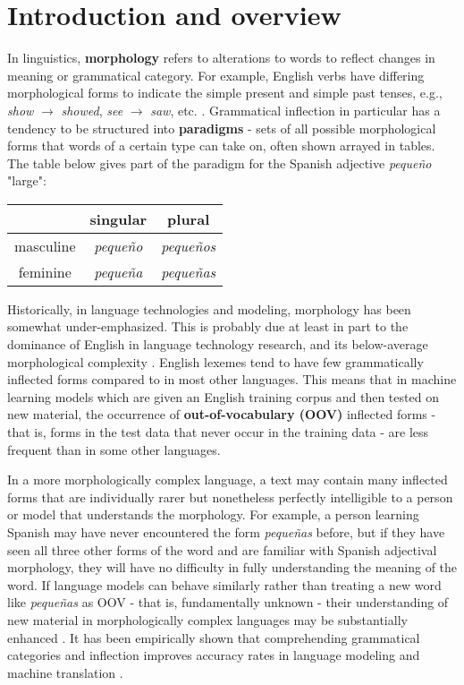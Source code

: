 \chapter{Introduction and overview}
\label{introduction}

In linguistics, \textbf{morphology} refers to alterations to words to reflect changes in meaning or grammatical category. For example, English verbs have differing morphological forms to indicate the simple present and simple past tenses, e.g., \textit{show} $\rightarrow$ \textit{showed}, \textit{see} $\rightarrow$ \textit{saw}, etc. \parencite{Dreyer2008}. Grammatical inflection in particular has a tendency to be structured into \textbf{paradigms} - sets of all possible morphological forms that words of a certain type can take on, often shown arrayed in tables. The table below gives part of the paradigm for the Spanish adjective \textit{pequeño} "large":

\begin{center}
\begin{tabular}{|c||c|c|}
\hline
& singular & plural \\
\hline \hline
masculine & \textit{pequeño} & \textit{pequeños} \\
\hline 
feminine & \textit{pequeña} & \textit{pequeñas} \\
\hline
\end{tabular}
\end{center}

Historically, in language technologies and modeling, morphology has been somewhat under-emphasized. This is probably due at least in part to the dominance of English in language technology research, and its below-average morphological complexity \parencite{Cotterell2017a}. English lexemes tend to have few grammatically inflected forms compared to in most other languages. This means that in machine learning models which are given an English training corpus and then tested on new material, the occurrence of \textbf{out-of-vocabulary (OOV)} inflected forms - that is, forms in the test data that never occur in the training data - are less frequent than in some other languages. 

In a more morphologically complex language, a text may contain many inflected forms that are individually rarer but nonetheless perfectly intelligible to a person or model that understands the morphology. For example, a person learning Spanish may have never encountered the form \textit{pequeñas} before, but if they have seen all three other forms of the word and are familiar with Spanish adjectival morphology, they will have no difficulty in fully understanding the meaning of the word. If language models can behave similarly rather than treating a new word like \textit{pequeñas} as OOV - that is, fundamentally unknown - their understanding of new material in morphologically complex languages may be substantially enhanced \parencite{Cotterell2016}. It has been empirically shown that comprehending grammatical categories and inflection improves accuracy rates in language modeling and machine translation \parencite{Faruqui2015}.

